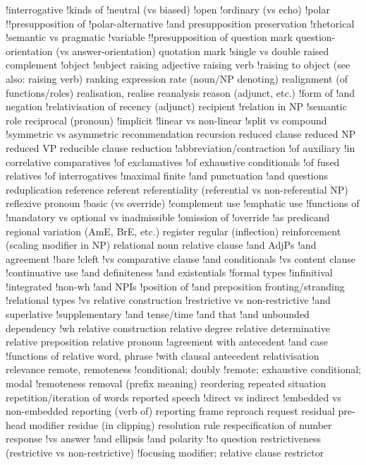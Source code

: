 !interrogative
!kinds of
!neutral (vs biased)
!open
!ordinary (vs echo)
!polar
!!presupposition of
!polar-alternative
!and presupposition preservation
!rhetorical
!semantic vs pragmatic
!variable
!!presupposition of
question mark
question-orientation (vs answer-orientation)
quotation mark
!single vs double
raised complement
!object
!subject
raising adjective
raising verb
!raising to object (see also: raising verb)
ranking expression
rate (noun/NP denoting)
realignment (of functions/roles)
realisation, realise
reanalysis
reason (adjunct, etc.)
!form of
!and negation
!relativisation of
recency (adjunct)
recipient
!relation in NP
!semantic role
reciprocal (pronoun)
!implicit
!linear vs non-linear
!split vs compound
!symmetric vs asymmetric
recommendation
recursion
reduced clause
reduced NP
reduced VP
reducible clause
reduction
!abbreviation/contraction
!of auxiliary
!in correlative comparatives
!of exclamatives
!of exhaustive conditionals
!of fused relatives
!of interrogatives
!maximal finite
!and punctuation
!and questions
reduplication
reference
referent
referentiality (referential vs non-referential NP)
reflexive pronoun
!basic (vs override)
!complement use
!emphatic use
!functions of
!mandatory vs optional vs inadmissible
!omission of
!override
!as predicand
regional variation (AmE, BrE, etc.)
register
regular (inflection)
reinforcement (scaling modifier in NP)
relational noun
relative clause
!and AdjPs
!and agreement
!bare
!cleft
!vs comparative clause
!and conditionals
!vs content clause
!continuative use
!and definiteness
!and existentials
!formal types
!infinitival
!integrated
!non-wh
!and NPIs
!position of
!and preposition fronting/stranding
!relational types
!vs relative construction
!restrictive vs non-restrictive
!and superlative
!supplementary
!and tense/time
!and that
!and unbounded dependency
!wh
relative construction
relative degree
relative determinative
relative preposition
relative pronoun
!agreement with antecedent
!and case
!functions of
relative word, phrase
!with clausal antecedent
relativisation
relevance
remote, remoteness
!conditional; doubly
!remote; exhaustive conditional; modal
!remoteness
removal (prefix meaning)
reordering
repeated situation
repetition/iteration of words
reported speech
!direct vs indirect
!embedded vs non-embedded
reporting (verb of)
reporting frame
reproach
request
residual pre-head modifier
residue (in clipping)
resolution rule
respecification of number
response
!vs answer
!and ellipsis
!and polarity
!to question
restrictiveness (restrictive vs non-restrictive)
!focusing modifier; relative clause
restrictor
